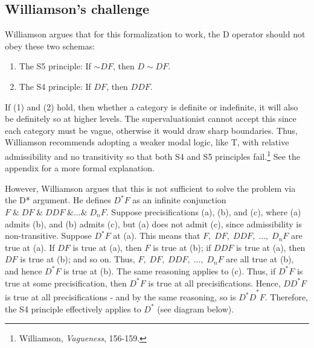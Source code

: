 \subsection{Williamson's challenge}

Williamson argues that for this formalization to work, the D operator
should not obey these two schemas:
\begin{enumerate}
\def\labelenumi{(\arabic{enumi})}
\item{The S5 principle: If ${\sim}DF$, then $D{\sim}DF$.}
\item{The S4 principle: If $DF$, then $DDF$.}
\end{enumerate}

If (1) and (2) hold, then whether a category is definite or indefinite,
it will also be definitely so at higher levels. The supervaluationist
cannot accept this since each category must be vague, otherwise it would
draw sharp boundaries. Thus, Williamson recommends adopting a weaker
modal logic, like T, with relative admissibility and no transitivity so
that both S4 and S5 principles fail.\footnote{Williamson,
  \emph{Vagueness}, 156-159.} See the appendix for a more formal
explanation.

However, Williamson argues that this is not sufficient to solve the
problem via the D* argument. He defines \(D^{*}F\) as an infinite
conjunction $F \; \&  \; DF \; \& \; DDF \; \& \ldots \& \; D_{n}F$. Suppose
precisifications (a), (b), and (c), where (a) admits (b), and (b) admits
(c), but (a) does not admit (c), since admissibility is non-transitive.
Suppose \(D^{*}F\) at (a). This means that
$F, \; DF, \; DDF, \; \ldots, \; D_{n}F$ are true at (a). If $DF$ is true at
(a), then $F$ is true at (b); if $DDF$ is true at (a), then $DF$
is true at (b); and so on. Thus, $F, \; DF, \; DDF, \; \ldots, \; D_{n}F$ are
all true at (b), and hence $D^{*}F$ is true at (b). The same reasoning
applies to (c). Thus, if $D^{*}F$ is true at some precisification,
then $D^{*}F$ is true at all precisifications. Hence, ${DD}^{*}F$ is
true at all precisifications - and by the same reasoning, so is
${D^{*}D}^{*}F$. Therefore, the S4 principle effectively applies to
$D^{*}$ (see diagram below).

